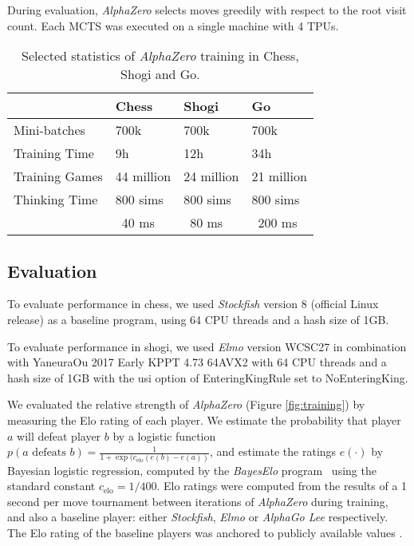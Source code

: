 \documentclass[12pt]{article}
\begin{document}
During evaluation, \emph{AlphaZero} selects moves greedily with respect to the root visit count. Each MCTS was executed on a single machine with 4 TPUs.

\begin{table}
\begin{tabularx}{\textwidth}{XXXX}
\toprule
& Chess & Shogi & Go \\
\midrule
Mini-batches & 700k & 700k & 700k \\
Training Time & 9h & 12h & 34h \\
Training Games & 44 million & 24 million & 21 million \\
Thinking Time & 800 sims & 800 sims & 800 sims  \\
              & ~40 ms & ~80 ms & ~200 ms \\
\bottomrule
\end{tabularx}
\caption
{
\label{tab:settings}
Selected statistics of \emph{AlphaZero} training in Chess, Shogi and Go. 
}
\end{table}

\subsection*{Evaluation}

To evaluate performance in chess, we used \emph{Stockfish} version 8 (official Linux release) as a baseline program, using 64 CPU threads and a hash size of 1GB.

To evaluate performance in shogi, we used \emph{Elmo} version WCSC27 in combination with YaneuraOu 2017 Early KPPT 4.73 64AVX2 with 64 CPU threads and a hash size of 1GB with the usi option of EnteringKingRule set to NoEnteringKing.

We evaluated the relative strength of \emph{AlphaZero} (Figure \ref{fig:training}) by measuring the Elo rating of each player. We estimate the probability that player $a$ will defeat player $b$ by a logistic function $p(a \text{ defeats } b) = \frac{1}{1 + \exp{(c_{\mathrm{elo}} (e(b) - e(a))}}$, and estimate the ratings $e(\cdot)$ by Bayesian logistic regression, computed by the \emph{BayesElo} program~\cite{coulom:bayeselo} using the standard constant $c_{\mathrm{elo}} = 1/400$. 
Elo ratings were computed from the results of a 1 second per move tournament between iterations of \emph{AlphaZero} during training, and also a baseline player: either \emph{Stockfish}, \emph{Elmo} or \emph{AlphaGo Lee} respectively. The Elo rating of the baseline players was anchored to publicly available values \cite{Silver17AG0}. 
\end{document}

